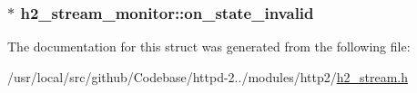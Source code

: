 \subsubsection[{\texorpdfstring{on\+\_\+state\+\_\+invalid}{on_state_invalid}}]{$\ast$ h2\+\_\+stream\+\_\+monitor\+::on\+\_\+state\+\_\+invalid}\hypertarget{structh2__stream__monitor_a9cd34db7bbe3e81dd763af85a3a537b8}{}\label{structh2__stream__monitor_a9cd34db7bbe3e81dd763af85a3a537b8}


The documentation for this struct was generated from the following file\+:\begin{DoxyCompactItemize}
\item 
/usr/local/src/github/\+Codebase/httpd-\/2../modules/http2/\hyperlink{h2__stream_8h}{h2\+\_\+stream.\+h}\end{DoxyCompactItemize}
